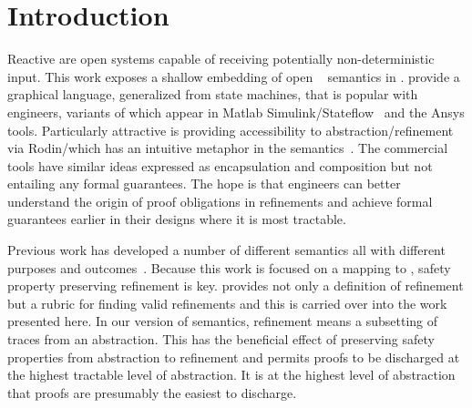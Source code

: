 

\section{Introduction}

Reactive \SCs are open systems capable of receiving potentially
non-deterministic input.  This work exposes a shallow embedding of
open \SCs~\cite{MoSn16,MoSnHo18} semantics in \EventB.  \SCs provide a
graphical language, generalized from state machines, that is popular
with engineers, variants of which appear in Matlab
Simulink/Stateflow~\cite{MATLAB:2019} and the Ansys tools.
Particularly attractive is providing accessibility to
abstraction/refinement via Rodin/\EventB which has an intuitive
metaphor in the \SC semantics~\cite{MoSn16,MoSnHo18}.  The commercial
tools have similar ideas expressed as encapsulation and composition
but not entailing any formal guarantees.  The hope is that engineers
can better understand the origin of proof obligations in refinements
and achieve formal guarantees earlier in their designs where it is
most tractable.

Previous work has developed a number of different semantics all with
different purposes and
outcomes~\cite{Syriani_2019,Harel,Maraninchi91theargos}.  Because this
work is focused on a mapping to \EventB, safety property preserving
refinement is key.  \EventB provides not only a definition of
refinement but a rubric for finding valid refinements and this is
carried over into the \SCs work presented here.  In our version of \SC
semantics, refinement means a subsetting of traces from an
abstraction.  This has the beneficial effect of preserving safety
properties from abstraction to refinement and permits proofs to be
discharged at the highest tractable level of abstraction.  It is at
the highest level of abstraction that proofs are presumably the
easiest to discharge.


